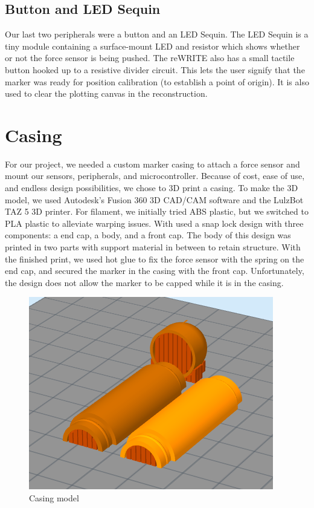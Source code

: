 \documentclass[12pt,journal]{IEEEtran}
\begin{document}
\subsection{Button and LED Sequin}
  Our last two peripherals were a button and an LED Sequin. The LED Sequin is a tiny module containing a surface-mount LED and resistor which shows whether or not the force sensor is being pushed. The reWRITE also has a small tactile button hooked up to a resistive divider circuit. This lets the user signify that the marker was ready for position calibration (to establish a point of origin). It is also used to clear the plotting canvas in the reconstruction.

\section{Casing}
  For our project, we needed a custom marker casing to attach a force sensor and mount our sensors, peripherals, and microcontroller. Because of cost, ease of use, and endless design possibilities, we chose to 3D print a casing. To make the 3D model, we used Autodesk’s Fusion 360 3D CAD/CAM software and the LulzBot TAZ 5 3D printer. For filament, we initially tried ABS plastic, but we switched to PLA plastic to alleviate warping issues. With used a snap lock design with three components: a end cap, a body, and a front cap. The body of this design was printed in two parts with support material in between to retain structure.
  With the finished print, we used hot glue to fix the force sensor with the spring on the end cap, and secured the marker in the casing with the front cap. Unfortunately, the design does not allow the marker to be capped while it is in the casing.


\begin{figure}[h]
    \includegraphics[width=0.6\linewidth]{figures/3d-model}
  \caption{Casing model}
  \label{fig:3d-model}
\end{figure}
\end{document}
